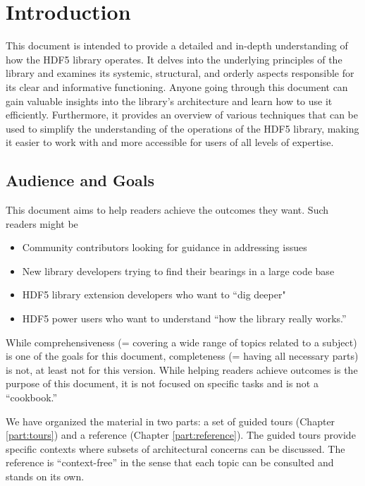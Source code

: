 
\chapter{Introduction}
This document is intended to provide a detailed and in-depth understanding of how the HDF5 library operates. It delves into the underlying principles of the library and examines its systemic, structural, and orderly aspects responsible for its clear and informative functioning. Anyone going through this document can gain valuable insights into the library’s architecture and learn how to use it efficiently. Furthermore, it provides an overview of various techniques that can be used to simplify the understanding of the operations of the HDF5 library, making it easier to work with and more accessible for users of all levels of expertise.

\section{Audience and Goals}

This document aims to help readers achieve the outcomes they want. Such readers might be

\begin{itemize}
    \item Community contributors looking for guidance in addressing issues
    \item New library developers trying to find their bearings in a large code base
    \item HDF5 library extension developers who want to ``dig deeper"
    \item HDF5 power users who want to understand ``how the library really works.''
\end{itemize}

While comprehensiveness (= covering a wide range of topics related to a subject) is one of the goals for this document, completeness (= having all necessary parts) is not, at least not for this version. While helping readers achieve outcomes is the purpose of this document, it is not focused on specific tasks and is not a ``cookbook.''

We have organized the material in two parts: a set of guided tours (Chapter \ref{part:tours}) and a reference (Chapter \ref{part:reference}). The guided tours provide specific contexts where subsets of architectural concerns can be discussed. The reference is ``context-free'' in the sense that each topic can be consulted and stands on its own.

